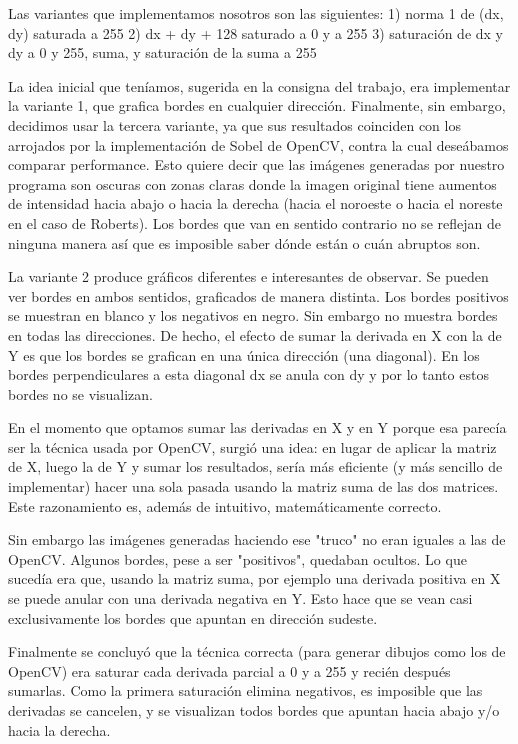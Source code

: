 Las variantes que implementamos nosotros son las siguientes:
    1) norma 1 de (dx, dy) saturada a 255
    2) dx + dy + 128 saturado a 0 y a 255
    3) saturación de dx y dy a 0 y 255, suma, y saturación de la suma a 255

La idea inicial que teníamos, sugerida en la consigna del trabajo, era implementar la variante 1, que grafica bordes en cualquier dirección. Finalmente, sin embargo, decidimos usar la tercera variante, ya que sus resultados coinciden con los arrojados por la implementación de Sobel de OpenCV, contra la cual deseábamos comparar performance. Esto quiere decir que las imágenes generadas por nuestro programa son oscuras con zonas claras donde la imagen original tiene aumentos de intensidad hacia abajo o hacia la derecha (hacia el noroeste o hacia el noreste en el caso de Roberts). Los bordes que van en sentido contrario no se reflejan de ninguna manera así que es imposible saber dónde están o cuán abruptos son.

La variante 2 produce gráficos diferentes e interesantes de observar. Se pueden ver bordes en ambos sentidos, graficados de manera distinta. Los bordes positivos se muestran en blanco y los negativos en negro. Sin embargo no muestra bordes en todas las direcciones. De hecho, el efecto de sumar la derivada en X con la de Y es que los bordes se grafican en una única dirección (una diagonal). En los bordes perpendiculares a esta diagonal dx se anula con dy y por lo tanto estos bordes no se visualizan.

En el momento que optamos sumar las derivadas en X y en Y porque esa parecía ser la técnica usada por OpenCV, surgió una idea: en lugar de aplicar la matriz de X, luego la de Y y sumar los resultados, sería más eficiente (y más sencillo de implementar) hacer una sola pasada usando la matriz suma de las dos matrices. Este razonamiento es, además de intuitivo, matemáticamente correcto.

Sin embargo las imágenes generadas haciendo ese "truco" no eran iguales a las de OpenCV. Algunos bordes, pese a ser "positivos", quedaban ocultos. Lo que sucedía era que, usando la matriz suma, por ejemplo una derivada positiva en X se puede anular con una derivada negativa en Y. Esto hace que se vean casi exclusivamente los bordes que apuntan en dirección sudeste.

Finalmente se concluyó que la técnica correcta (para generar dibujos como los de OpenCV) era saturar cada derivada parcial a 0 y a 255 y recién después sumarlas. Como la primera saturación elimina negativos, es imposible que las derivadas se cancelen, y se visualizan todos bordes que apuntan hacia abajo y/o hacia la derecha.


